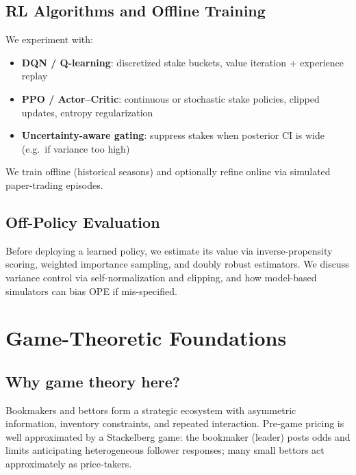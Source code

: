 \subsection{RL Algorithms and Offline Training}
We experiment with:
\begin{itemize}
  \item \textbf{DQN / Q-learning}: discretized stake buckets, value iteration + experience replay
  \item \textbf{PPO / Actor–Critic}: continuous or stochastic stake policies, clipped updates, entropy regularization
  \item \textbf{Uncertainty-aware gating}: suppress stakes when posterior CI is wide (e.g.\ if variance too high)
\end{itemize}
We train offline (historical seasons) and optionally refine online via simulated paper-trading episodes.

\subsection{Off-Policy Evaluation}
Before deploying a learned policy, we estimate its value via inverse-propensity scoring, weighted importance sampling, and doubly robust estimators. We discuss variance control via self-normalization and clipping, and how model-based simulators can bias OPE if mis-specified.

\section{Game-Theoretic Foundations}
\label{sec:game-theory}
\subsection{Why game theory here?}
Bookmakers and bettors form a strategic ecosystem with asymmetric information, inventory constraints, and repeated interaction. Pre‑game pricing is well approximated by a Stackelberg game: the bookmaker (leader) posts odds and limits anticipating heterogeneous follower responses; many small bettors act approximately as price‑takers.

